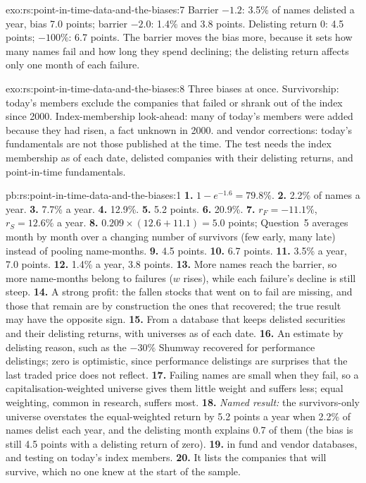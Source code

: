 \begin{solution}{exo:rs:point-in-time-data-and-the-biases:7}
Barrier $-1.2$: 3.5\% of names delisted a year, bias 7.0 points; barrier $-2.0$: 1.4\% and 3.8 points. Delisting return 0: 4.5
points; $-100\%$: 6.7 points. The barrier moves the bias more, because it sets how many names fail and how long they spend
declining; the delisting return affects only one month of each failure.
\end{solution}

\begin{solution}{exo:rs:point-in-time-data-and-the-biases:8}
Three biases at once. Survivorship: today's members exclude the companies that failed or shrank out of the index since 2000.
Index-membership look-ahead: many of today's members were added because they had risen, a fact unknown in 2000. 
and vendor corrections: today's fundamentals are not those published at the time. The test needs the index membership as of each
date, delisted companies with their delisting returns, and point-in-time fundamentals.
\end{solution}

\begin{solution}{pb:rs:point-in-time-data-and-the-biases:1}
\textbf{1.} $1 - e^{-1.6} = 79.8\%$. \textbf{2.} 2.2\% of names a year. \textbf{3.} 7.7\% a year. \textbf{4.} 12.9\%.
\textbf{5.} 5.2 points. \textbf{6.} 20.9\%. \textbf{7.} $r_F = -11.1\%$, $r_S = 12.6\%$ a year. \textbf{8.} $0.209 \times (12.6 +
11.1) = 5.0$ points; Question~5 averages month by month over a changing number of survivors (few early, many late) instead of
pooling name-months. \textbf{9.} 4.5 points. \textbf{10.} 6.7 points. \textbf{11.} 3.5\% a year, 7.0 points. \textbf{12.} 1.4\%
a year, 3.8 points. \textbf{13.} More names reach the barrier, so more name-months belong to failures ($w$ rises), while each
failure's decline is still steep. \textbf{14.} A strong profit: the fallen stocks that went on to fail are missing, and those that
remain are by construction the ones that recovered; the true result may have the opposite sign. \textbf{15.} From a database that
keeps delisted securities and their delisting returns, with universes as of each date. \textbf{16.} An estimate by delisting
reason, such as the $-30\%$ Shumway recovered for performance delistings; zero is optimistic, since performance delistings are
surprises that the last traded price does not reflect. \textbf{17.} Failing names are small when they fail, so a
capitalisation-weighted universe gives them little weight and suffers less; equal weighting, common in research, suffers most.
\textbf{18.} \emph{Named result:} the survivors-only universe overstates the equal-weighted return by 5.2 points a year when 2.2\%
of names delist each year, and the delisting month explains 0.7 of them (the bias is still 4.5 points with a delisting return of
zero). \textbf{19.}  in fund and vendor databases, and testing on today's index members. \textbf{20.} It lists the
companies that will survive, which no one knew at the start of the sample.
\end{solution}

